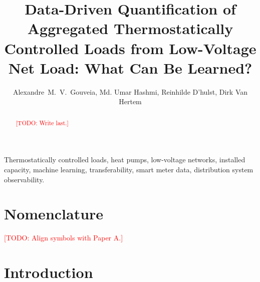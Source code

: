 \documentclass[9pt,journal,a4paper]{IEEEtran}
\newcommand{\todo}[1]{\textcolor{red}{[TODO: #1]}}
\begin{document}
\title{Data-Driven Quantification of Aggregated Thermostatically Controlled Loads from Low-Voltage Net Load: What Can Be Learned?}

\author{Alexandre~M.~V.~Gouveia, Md. Umar Hashmi, Reinhilde D'hulst, Dirk Van Hertem}

\maketitle

\begin{abstract}
\todo{Write last.}
\end{abstract}

\begin{IEEEkeywords}
Thermostatically controlled loads, heat pumps, low-voltage networks, installed capacity, machine learning, transferability, smart meter data, distribution system observability.
\end{IEEEkeywords}

\section*{Nomenclature}
\todo{Align symbols with Paper A.}

\section{Introduction}
\label{sec:intro}
\end{document}
